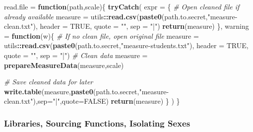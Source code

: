 \documentclass[]{article}
\newenvironment{Shaded}{\begin{snugshade}}{\end{snugshade}}
\newcommand{\CommentTok}[1]{\textcolor[rgb]{0.56,0.35,0.01}{\textit{#1}}}
\newcommand{\ControlFlowTok}[1]{\textcolor[rgb]{0.13,0.29,0.53}{\textbf{#1}}}
\newcommand{\DataTypeTok}[1]{\textcolor[rgb]{0.13,0.29,0.53}{#1}}
\newcommand{\KeywordTok}[1]{\textcolor[rgb]{0.13,0.29,0.53}{\textbf{#1}}}
\newcommand{\NormalTok}[1]{#1}
\newcommand{\OperatorTok}[1]{\textcolor[rgb]{0.81,0.36,0.00}{\textbf{#1}}}
\newcommand{\OtherTok}[1]{\textcolor[rgb]{0.56,0.35,0.01}{#1}}
\newcommand{\StringTok}[1]{\textcolor[rgb]{0.31,0.60,0.02}{#1}}
\begin{document}
\begin{Shaded}
\begin{Highlighting}[]
\NormalTok{read.file =}\StringTok{ }\ControlFlowTok{function}\NormalTok{(path,scale)\{}
  \KeywordTok{tryCatch}\NormalTok{(}
    \DataTypeTok{expr =}\NormalTok{ \{}
      \CommentTok{\# Open cleaned file if already available}
\NormalTok{      measure =}\StringTok{ }\NormalTok{utils}\OperatorTok{::}\KeywordTok{read.csv}\NormalTok{(}\KeywordTok{paste0}\NormalTok{(path.to.secret,}\StringTok{"measure{-}clean.txt"}\NormalTok{),}
                                \DataTypeTok{header =} \OtherTok{TRUE}\NormalTok{, }\DataTypeTok{quote =} \StringTok{""}\NormalTok{, }\DataTypeTok{sep =} \StringTok{"|"}\NormalTok{)}
      \KeywordTok{return}\NormalTok{(measure)}
\NormalTok{    \},}
    \DataTypeTok{warning =} \ControlFlowTok{function}\NormalTok{(w)\{}
      \CommentTok{\# If no clean file, open original file}
\NormalTok{      measure =}\StringTok{ }\NormalTok{utils}\OperatorTok{::}\KeywordTok{read.csv}\NormalTok{(}\KeywordTok{paste0}\NormalTok{(path.to.secret,}\StringTok{"measure{-}students.txt"}\NormalTok{),}
                                \DataTypeTok{header =} \OtherTok{TRUE}\NormalTok{, }\DataTypeTok{quote =} \StringTok{""}\NormalTok{, }\DataTypeTok{sep =} \StringTok{"|"}\NormalTok{)}
      \CommentTok{\# Clean data}
\NormalTok{      measure =}\StringTok{ }\KeywordTok{prepareMeasureData}\NormalTok{(measure,scale)}
      
      \CommentTok{\# Save cleaned data for later}
      \KeywordTok{write.table}\NormalTok{(measure,}\KeywordTok{paste0}\NormalTok{(path.to.secret,}\StringTok{"measure{-}clean.txt"}\NormalTok{),}\DataTypeTok{sep=}\StringTok{"|"}\NormalTok{,}\DataTypeTok{quote=}\OtherTok{FALSE}\NormalTok{)}
      \KeywordTok{return}\NormalTok{(measure)}
\NormalTok{    \}}
\NormalTok{  )    }
\NormalTok{\}}
\end{Highlighting}
\end{Shaded}

\subsubsection{Libraries, Sourcing Functions, Isolating Sexes}
\label{sec:sourcing}
\end{document}
